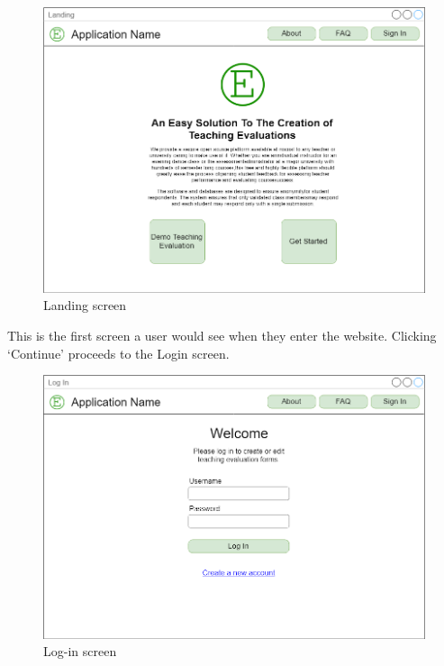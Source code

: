 \documentclass{article}
\begin{document}
\begin{center}
\begin{figure}[H]
    \centering
    \caption{Landing screen}
    \includegraphics[scale=.35]{images/landing_screen.png}
\end{figure}
\end{center}

This is the first screen a user would see when they enter the website. Clicking `Continue' proceeds to the Login screen.

\begin{center}
\begin{figure}[H]
    \centering
    \caption{Log-in screen}
    \includegraphics[scale=.35]{images/login_screen.png}
\end{figure}
\end{center}
\end{document}
